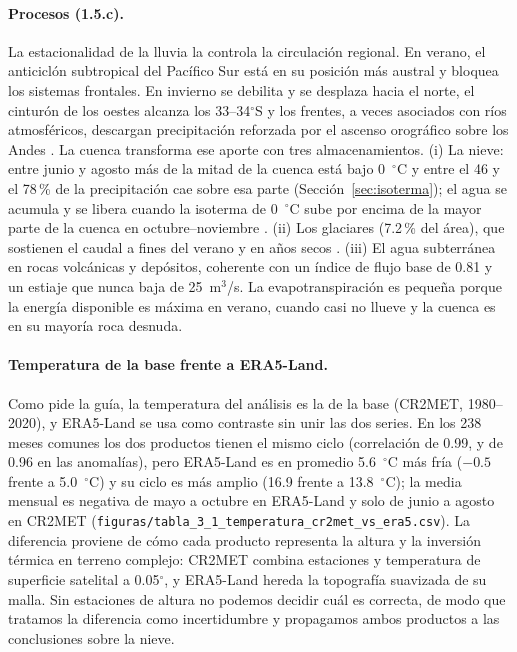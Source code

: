 \documentclass[11pt,a4paper]{article}
\newcommand{\archivo}[1]{\nolinkurl{#1}}
\begin{document}
\paragraph{Procesos (1.5.c).} La estacionalidad de la lluvia la controla la circulación regional. En verano, el anticiclón subtropical del Pacífico Sur está en su posición más austral y bloquea los sistemas frontales. En invierno se debilita y se desplaza hacia el norte, el cinturón de los oestes alcanza los 33--34$^\circ$S y los frentes, a veces asociados con ríos atmosféricos, descargan precipitación reforzada por el ascenso orográfico sobre los Andes \citep{FalveyGarreaud2007,Viale2011,Garreaud2009}. La cuenca transforma ese aporte con tres almacenamientos. (i) La nieve: entre junio y agosto más de la mitad de la cuenca está bajo 0~$^\circ$C y entre el 46 y el 78\,\% de la precipitación cae sobre esa parte (Sección~\ref{sec:isoterma}); el agua se acumula y se libera cuando la isoterma de 0~$^\circ$C sube por encima de la mayor parte de la cuenca en octubre--noviembre \citep{Masiokas2006}. (ii) Los glaciares (7.2\,\% del área), que sostienen el caudal a fines del verano y en años secos \citep{Ayala2020}. (iii) El agua subterránea en rocas volcánicas y depósitos, coherente con un índice de flujo base de 0.81 y un estiaje que nunca baja de 25~m$^3$/s. La evapotranspiración es pequeña porque la energía disponible es máxima en verano, cuando casi no llueve y la cuenca es en su mayoría roca desnuda.

\paragraph{Temperatura de la base frente a ERA5-Land.}
\label{sec:temp}
Como pide la guía, la temperatura del análisis es la de la base (CR2MET, 1980--2020), y ERA5-Land se usa como contraste sin unir las dos series. En los 238 meses comunes los dos productos tienen el mismo ciclo (correlación de 0.99, y de 0.96 en las anomalías), pero ERA5-Land es en promedio 5.6~$^\circ$C más fría ($-0.5$ frente a 5.0~$^\circ$C) y su ciclo es más amplio (16.9 frente a 13.8~$^\circ$C); la media mensual es negativa de mayo a octubre en ERA5-Land y solo de junio a agosto en CR2MET (\archivo{figuras/tabla_3_1_temperatura_cr2met_vs_era5.csv}). La diferencia proviene de cómo cada producto representa la altura y la inversión térmica en terreno complejo: CR2MET combina estaciones y temperatura de superficie satelital a 0.05$^\circ$, y ERA5-Land hereda la topografía suavizada de su malla. Sin estaciones de altura no podemos decidir cuál es correcta, de modo que tratamos la diferencia como incertidumbre y propagamos ambos productos a las conclusiones sobre la nieve.
\end{document}
